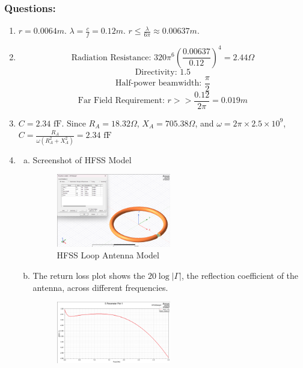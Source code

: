 \documentclass{article} %
\begin{document}
\subsubsection*{Questions:}
\begin{enumerate}[]
    \item $r = 0.0064 \si{m}$. $\lambda = \frac{c}{f} = 0.12 \si{m}$. $r \leq \frac{\lambda}{6 \pi} \approx 0.00637 \si{m}$.
    \item
          \[\text{Radiation Resistance: }320 \pi^6 \left(\frac{0.00637}{0.12}\right)^4 = 2.44 \Omega \]
          \[\text{Directivity: } 1.5\]
          \[\text{Half-power beamwidth: } \frac{\pi}{2}\]
          \[\text{Far Field Requirement: } r >> \frac{0.12}{2\pi} = 0.019 \si{m}\]
    \item $C = 2.34 \text{ fF}$. Since $R_A = 18.32 \Omega$, $X_A = 705.38 \Omega$, and $\omega = 2 \pi \times 2.5 \times 10^9$, $C = \frac{R_{A}}{\omega (R_{A}^{2}+X_{A}^{2})} = 2.34 \text{ fF}$
    \item
          \begin{enumerate}[(a)]
              \item Screenshot of HFSS Model
                    \begin{figure}[H]
                        \centering
                        \includegraphics[width=0.5\textwidth]{./image/figure1.png}
                        \caption{HFSS Loop Antenna Model}
                    \end{figure}
              \item The return loss plot shows the $20 \log |\Gamma| $, the reflection coefficient of the antenna, across different frequencies.
                    \begin{figure}[H]
                        \centering
                        \includegraphics[width=0.5\textwidth]{./image/figure2.png}

\end{figure}
\end{enumerate}
\end{enumerate}
\end{document}
